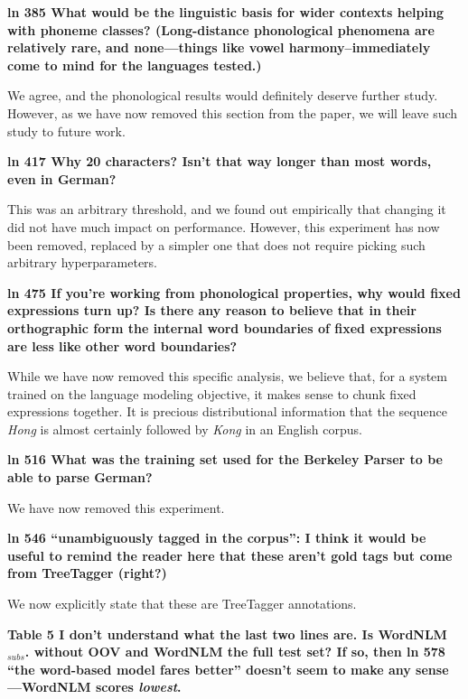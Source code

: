 \documentclass{article}[11pt,a4paper,oneside]
\begin{document}
\textbf{ln 385 What would be the linguistic basis for wider contexts helping with phoneme classes? (Long-distance phonological phenomena are relatively rare, and none---things like vowel harmony--immediately come to mind for the languages tested.)}

We agree, and the phonological results would definitely deserve further study. However, as we have now removed this section from the paper, we will leave such study to future work.
\newline

\textbf{ln 417 Why 20 characters? Isn't that way longer than most words, even in German?}

This was an arbitrary threshold, and we found out empirically that changing it did not have much impact on performance. However, this experiment has now been removed, replaced by a simpler one that does not require picking such arbitrary hyperparameters.
\newline

\textbf{ln 475 If you're working from phonological properties, why would fixed expressions turn up? Is there any reason to believe that in their orthographic form the internal word boundaries of fixed expressions are less like other word boundaries?}

While we have now removed this specific analysis, we believe that, for a system trained on the language modeling objective, it makes sense to chunk fixed expressions together. It is precious distributional information that the sequence \textit{Hong} is almost certainly followed by \textit{Kong} in an English corpus.
\newline

\textbf{ln 516 What was the training set used for the Berkeley Parser to be able to parse German?}

We have now removed this experiment.
\newline

\textbf{ln 546 ``unambiguously tagged in the corpus'':  I think it would be useful to remind the reader here that these aren't gold tags but come from TreeTagger (right?)}

We now explicitly state that these are TreeTagger annotations.
\newline

\textbf{Table 5 I don't understand what the last two lines are. Is WordNLM$_{subs}$. without OOV and WordNLM the full test set? If so, then ln 578 ``the word-based model fares better'' doesn't seem to make any sense---WordNLM scores \emph{lowest}.}
\end{document}
